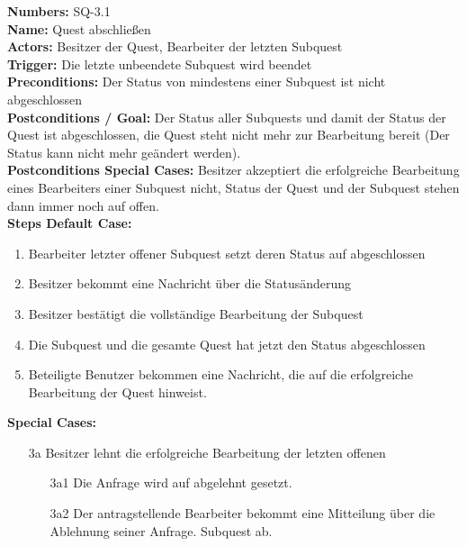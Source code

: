 \documentclass{article}
\begin{document}
\begin{samepage}
\textbf{Numbers:} SQ-3.1\\
\textbf{Name:} Quest abschließen\\
\textbf{Actors:} Besitzer der Quest, Bearbeiter der letzten Subquest\\
\textbf{Trigger:} Die letzte unbeendete Subquest wird beendet\\
\textbf{Preconditions:} Der Status von mindestens einer Subquest ist nicht abgeschlossen\\
\textbf{Postconditions / Goal:} Der Status aller Subquests und damit der Status der Quest ist abgeschlossen, die Quest steht nicht mehr zur Bearbeitung bereit (Der Status kann nicht mehr geändert werden). \\
\textbf{Postconditions Special Cases:} Besitzer akzeptiert die erfolgreiche Bearbeitung eines Bearbeiters einer Subquest nicht, Status der Quest und der Subquest stehen dann immer noch auf offen.\\
\textbf{Steps Default Case:}
\begin{enumerate}
    \item Bearbeiter letzter offener Subquest setzt deren Status auf abgeschlossen
    \item Besitzer bekommt eine Nachricht über die Statusänderung
    \item Besitzer bestätigt die vollständige Bearbeitung der Subquest
    \item Die Subquest und die gesamte Quest hat jetzt den Status abgeschlossen
    \item Beteiligte Benutzer bekommen eine Nachricht, die auf die erfolgreiche Bearbeitung der Quest hinweist.
\end{enumerate}
\textbf{Special Cases:}
\begin{itemize}
\item [3a] Besitzer lehnt die erfolgreiche Bearbeitung der letzten offenen
\begin{itemize}
    \item [3a1] Die Anfrage wird auf abgelehnt gesetzt.\\
    \item [3a2] Der antragstellende Bearbeiter bekommt eine Mitteilung über die Ablehnung seiner Anfrage.
    Subquest ab.
\end{itemize}
\end{itemize}
\end{samepage}

\vspace{0.5cm}
\end{document}
